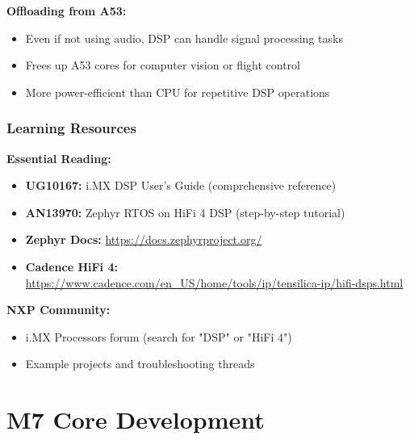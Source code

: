 \documentclass[12pt,a4paper]{report}
\begin{document}
\textbf{Offloading from A53:}
\begin{itemize}
    \item Even if not using audio, DSP can handle signal processing tasks
    \item Frees up A53 cores for computer vision or flight control
    \item More power-efficient than CPU for repetitive DSP operations
\end{itemize}

\subsection{Learning Resources}

\begin{docref}
\textbf{Essential Reading:}

\begin{itemize}
    \item \textbf{UG10167:} i.MX DSP User's Guide (comprehensive reference)
    \item \textbf{AN13970:} Zephyr RTOS on HiFi 4 DSP (step-by-step tutorial)
    \item \textbf{Zephyr Docs:} \url{https://docs.zephyrproject.org/}
    \item \textbf{Cadence HiFi 4:} \url{https://www.cadence.com/en_US/home/tools/ip/tensilica-ip/hifi-dsps.html}
\end{itemize}

\textbf{NXP Community:}
\begin{itemize}
    \item i.MX Processors forum (search for "DSP" or "HiFi 4")
    \item Example projects and troubleshooting threads
\end{itemize}
\end{docref}

\chapter{M7 Core Development}
\end{document}
